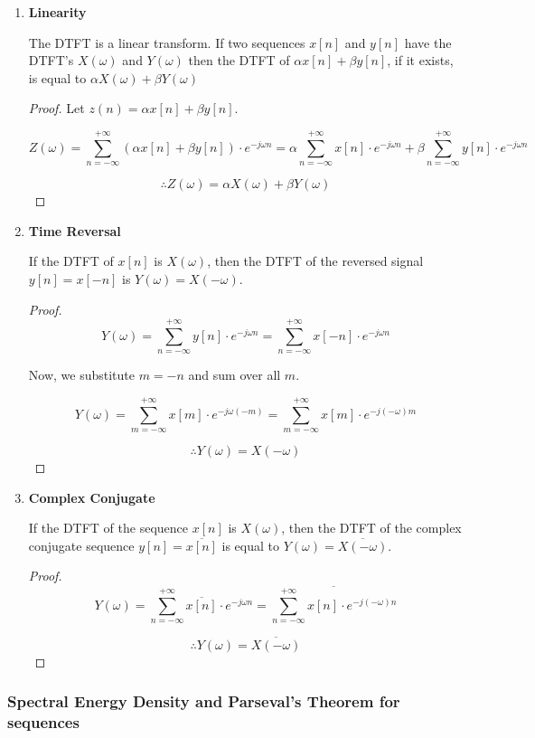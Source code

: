 \documentclass{article}
\theoremstyle{definition}
\begin{document}
\begin{enumerate}
\item \textbf{Linearity}

The DTFT is a linear transform. If two sequences $x[n]$ and $y[n]$ have the DTFT's $X(\omega)$ and $Y(\omega)$ then the DTFT of $\alpha x[n] + \beta y[n]$, if it exists, is equal to $\alpha X(\omega) + \beta Y(\omega)$ 
\begin{proof}
Let $z(n) = \alpha x[n] + \beta y[n]$. 

\[
		Z(\omega) = \sum_{n=-\infty}^{+\infty} (\alpha x[n] + \beta y[n]) \cdot e^{-j\omega n} = \alpha \sum_{n=-\infty}^{+\infty} x[n] \cdot e^{-j\omega n} + \beta  \sum_{n=-\infty}^{+\infty} y[n] \cdot e^{-j\omega n}
\]

\[
	\therefore \boxed{Z(\omega) = \alpha X(\omega) + \beta Y(\omega)}
\]
\end{proof}

\item \textbf{Time Reversal}

If the DTFT of $x[n]$ is $X(\omega)$, then the DTFT of the reversed signal $y[n] = x[-n]$ is $Y(\omega) = X(-\omega)$. 
\begin{proof}
\[
	Y(\omega) = \sum_{n = -\infty}^{+\infty} y[n] \cdot e^{-j\omega n} = \sum_{n = -\infty}^{+\infty} x[-n] \cdot e^{-j\omega n}
\]

Now, we substitute $m = -n$ and sum over all $m$. 

\[
	Y(\omega) = \sum_{m = -\infty}^{+\infty} x[m] \cdot e^{-j\omega (-m)} = \sum_{m = -\infty}^{+\infty} x[m] \cdot e^{-j(-\omega) m}
\]

\[
	\therefore \boxed{Y(\omega) = X(-\omega)}
\]
\end{proof}

\item \textbf{Complex Conjugate} 

If the DTFT of the sequence $x[n]$ is $X(\omega)$, then the DTFT of the complex conjugate sequence $y[n] = \overline{x[n]}$ is equal to $Y(\omega) = \overline{X(-\omega)}$.
\begin{proof}
\[
	Y(\omega) = \sum_{n = -\infty}^{+\infty} \overline{x[n]} \cdot e^{-j\omega n} = \overline{\sum_{n = -\infty}^{+\infty} x[n] \cdot e^{-j(-\omega) n} }
\]

\[
	\therefore \boxed{Y(\omega) = \overline{X(-\omega)}}
\]
\end{proof}
\end{enumerate}
 \subsubsection{Spectral Energy Density and Parseval's Theorem for sequences}
 
\end{document}
